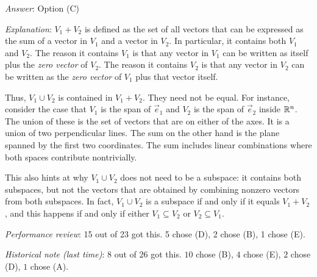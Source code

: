 \documentclass[10pt]{amsart}
\begin{document}
\begin{enumerate}
  {\em Answer}: Option (C)

  {\em Explanation}: $V_1 + V_2$ is defined as the set of all vectors
  that can be expressed as the sum of a vector in $V_1$ and a vector
  in $V_2$. In particular, it contains both $V_1$ and $V_2$. The
  reason it contains $V_1$ is that any vector in $V_1$ can be written
  as itself plus the {\em zero vector} of $V_2$. The reason it
  contains $V_2$ is that any vector in $V_2$ can be written as the
  {\em zero vector} of $V_1$ plus that vector itself.

  Thus, $V_1 \cup V_2$ is contained in $V_1 + V_2$. They need not be
  equal. For instance, consider the case that $V_1$ is the span of
  $\vec{e}_1$ and $V_2$ is the span of $\vec{e}_2$ inside $\mathbb{R}^n$. The
  union of these is the set of vectors that are on either of the
  axes. It is a union of two perpendicular lines. The sum on the other
  hand is the plane spanned by the first two coordinates. The sum
  includes linear combinations where both spaces contribute
  nontrivially.

  This also hints at why $V_1 \cup V_2$ does not need to be a
  subspace: it contains both subspaces, but not the vectors that are
  obtained by combining nonzero vectors from both subspaces. In fact,
  $V_1 \cup V_2$ is a subspace if and only if it equals $V_1 + V_2$,
  and this happens if and only if either $V_1 \subseteq V_2$ or $V_2
  \subseteq V_1$.

  {\em Performance review}: 15 out of 23 got this. 5 chose (D), 2
  chose (B), 1 chose (E).

  {\em Historical note (last time)}: $8$ out of $26$ got this. $10$ chose (B),
  $4$ chose (E), $2$ chose (D), $1$ chose (A).

\end{enumerate}
\end{document}
